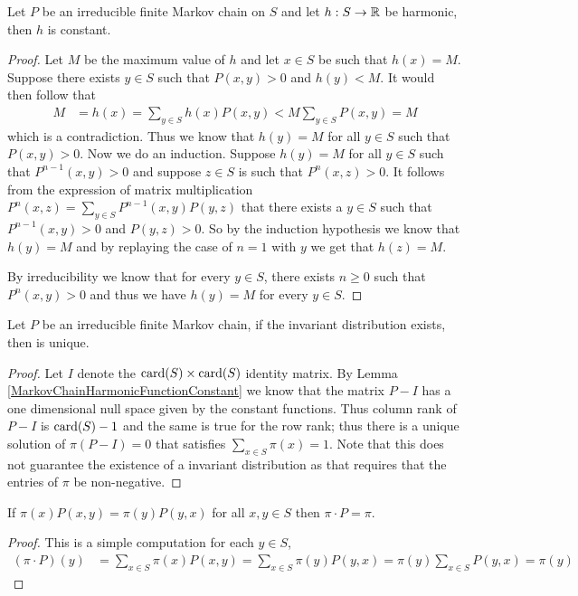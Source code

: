 \begin{lem}\label{MarkovChainHarmonicFunctionConstant}Let $P$ be an irreducible finite Markov chain on $S$ and let $h :
  S \to \mathbb{R}$ be harmonic, then $h$ is constant.
\end{lem}
\begin{proof}
Let $M$ be the maximum value of $h$ and let $x \in S$ be such that
$h(x) = M$.  Suppose there exists $y \in S$ such that $P(x,y) > 0$ and
$h(y) < M$.  It would then follow that
\begin{align*}
M &= h(x) = \sum_{y \in S} h(x) P(x,y) < M \sum_{y \in S} P(x,y) = M
\end{align*}
which is a contradiction.  Thus we know that $h(y) = M$ for all $y \in
S$ such that $P(x,y) > 0$.  Now we do an induction.  Suppose $h(y) =
M$ for all $y \in S$ such that $P^{n-1}(x, y) > 0$ and suppose $z \in
S$ is such that $P^n(x,z) > 0$.  It follows from the expression of
matrix multiplication $P^n(x,z) = \sum_{y \in S} P^{n-1}(x,y) P(y,z)$
that there exists a $y \in S$ such that $P^{n-1}(x,y) > 0$ and $P(y,z)
> 0$.  So by the induction hypothesis we know that $h(y) = M$ and by
replaying the case of $n=1$ with $y$ we get that $h(z) = M$.  

By irreducibility we know that for every $y \in S$, there exists $n
\geq 0$ such that $P^n(x,y) > 0$ and thus we have
$h(y) = M$  for every $y \in S$.
\end{proof}

\begin{lem}Let $P$ be an irreducible finite Markov chain, if the
  invariant distribution exists, then is unique.
\end{lem}
\begin{proof}
Let $I$ denote the $\operatorname*{card}(S) \times \operatorname*{card}(S)$ identity matrix.
By Lemma \ref{MarkovChainHarmonicFunctionConstant} we know that the
matrix $P -I$ has a one dimensional null space given by the constant
functions.  Thus column rank of $P - I$ is $\operatorname*{card}(S) - 1$ and the same
is true for the row rank; thus there is a unique solution of $\pi (P
-I) = 0$ that satisfies $\sum_{x \in S} \pi(x) = 1$.  Note that this
does not guarantee the existence of a invariant distribution as that
requires that the entries of $\pi$ be non-negative.
\end{proof}

\begin{lem}\label{DetailBalanceEquationImpliesInvariance}If $\pi(x) P(x,y) = \pi(y) P(y,x)$ for all $x,y \in S$ then
  $\pi \cdot P = \pi$.
\end{lem}
\begin{proof}
This is a simple computation for each $y \in S$,
\begin{align*}
(\pi \cdot P)(y) &=\sum_{x \in S} \pi(x) P (x,y)  = \sum_{x \in S} \pi(y) P(y,x) =
\pi(y) \sum_{x \in S} P(y,x) = \pi(y)
\end{align*}
\end{proof}

